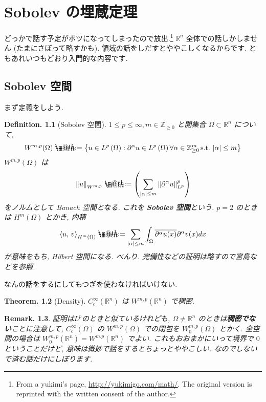 \documentclass[openany, a4paper, oneside]{book}
\makeatletter
\newcommand*{\defeq}{\mathrel{\rlap{%
\raisebox{0.3ex}{$\m@th\cdot$}}%
\raisebox{-0.3ex}{$\m@th\cdot$}}%
=}
\theoremstyle{break}
\newtheorem{thm}{Theorem.}[section]
\theoremstyle{breakdefn}
\newtheorem{defn}[thm]{Definition.}
\newtheorem{rem}[thm]{Remark.}
\newcommand{\abs}[1]{\left|#1\right|}
\newcommand{\norm}[1]{\left\Vert#1\right\Vert}
\newcommand{\rbk}[1]{\left (#1\right)}
\newcommand{\bkt}[2]{\left\langle#1,\,#2\right\rangle}
\newcommand{\set}[2]{\left\{#1 : #2\right\}}
\newcommand{\bbR}{\mathbb{R}}
\newcommand{\bbRn}{\mathbb{R}^n}
\newcommand{\bbZ}{\mathbb{Z}}
\newcommand{\Ccinfty}{C_{\mathrm{c}}^{\infty}}
\makeatother
\begin{document}
\chapter{Sobolev の埋蔵定理}
\label{sec-7-6}

どっかで話す予定がボツになってしまったので放出.\footnote{From a yukimi's page, \href{http://yukimigo.com/math/}{http://yukimigo.com/math/}.
The original version is reprinted with the written consent of the author.
 }
$\mathbb{R}^n$ 全体での話しかしません (たまにさぼって略すかも).
領域の話をしだすとややこしくなるからです.
ともあれいつもどおり入門的な内容です.
\section{Sobolev 空間}
\label{sec-7-6-1}

まず定義をしよう.
\begin{defn}[Sobolev 空間]
 $1 \le p \le \infty, m \in \bbZ_{\ge 0}$
 と開集合 $\Omega \subset \bbRn$ について,
 \begin{align}
  W^{m, p}(\Omega)
  \defeq
  \set{u \in L^p \rbk{\Omega}}{\partial^{\alpha} u \in L^p \rbk{\Omega} \forall \alpha \in \bbZ_{\geq 0}^{m}\, \text{s.t.} \, \abs{\alpha} \le m }
 \end{align}
 $W^{m, p}(\Omega)$ は
 \begin{align}
  \norm{u}_{W^{m,p}}
  \defeq
  \rbk{\sum_{\abs{\alpha} \le m} \norm{\partial^{\alpha} u}_{L^p}^p}
 \end{align}
 をノルムとして Banach 空間となる.
 これを \textbf{Sobolev 空間}という.
 $p = 2$ のときは $H^m (\Omega)$ とかき, 内積
 \begin{align}
  \bkt{u}{v}_{H^m \rbk{\Omega}}
  \defeq
  \sum_{\abs{\alpha} \leq m}
  \int_{\Omega} \overline{\partial^{\alpha}u (x)} \partial^{\alpha}v (x) dx
 \end{align}
 が意味をもち, Hilbert 空間になる.
 べんり.
 完備性などの証明は略すので宮島\cite{ShizuoMiyajima1}などを参照.
\end{defn}
なんの話をするにしてもつぎを使わなければいけない.
\begin{thm}[Density]
 $\Ccinfty(\bbRn)$ は $W^{m, p}(\bbR^n)$ で稠密.
\end{thm}
\begin{rem}
 証明は$L^p$のときと似ているけれども, $\Omega \neq \bbR^n$ のときは\textbf{稠密でない}ことに注意して,
 $\Ccinfty (\Omega)$ の $W^{m, p}(\Omega)$ での閉包を $W_0^{m, p}(\Omega)$ とかく.
 全空間の場合は $W_0^{m, p}(\mathbb{R}^n) = W^{m. p}(\mathbb{R}^n)$ でよい.
 これもおおまかにいって境界で $0$ ということだけど, 意味は微妙で話をするとちょっとややこしい.
 なのでしないで済む話だけにしぼります.
\end{rem}
\end{document}
